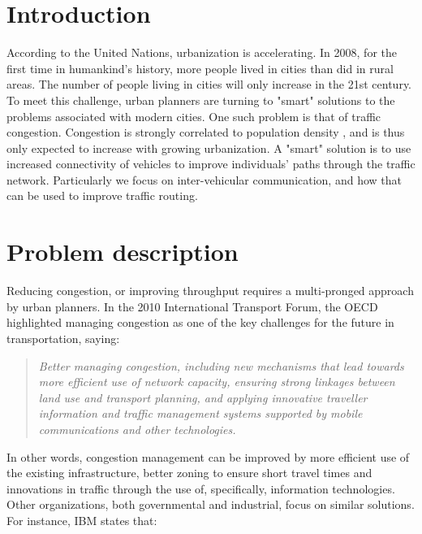 \documentclass{article}
\begin{document}
\section{Introduction}
According to the United Nations, urbanization is accelerating. In 2008, for the first time in humankind's history, more people lived in cities than did in rural areas. The number of people living in cities will only increase in the 21st century. To meet this challenge, urban planners are turning to "smart" solutions to the problems associated with modern cities. One such problem is that of traffic congestion. Congestion is strongly correlated to population density \cite{Manville2005}, and is thus only expected to increase with growing urbanization. A "smart" solution is to use increased connectivity of vehicles to improve individuals' paths through the traffic network. Particularly we focus on inter-vehicular communication, and how that can be used to improve traffic routing.

\section{Problem description}
Reducing congestion, or improving throughput requires a multi-pronged approach by urban planners. In the 2010 International Transport Forum, the OECD highlighted managing congestion as one of the key challenges for the future in transportation, saying: 
\begin{quote}
\emph{Better managing congestion, including new mechanisms that lead towards more efficient use of network capacity, ensuring strong linkages between land use and transport planning, and applying innovative traveller information and traffic management systems supported by mobile communications and other technologies.} \cite{OECD2010}
\end{quote}

In other words, congestion management can be improved by more efficient use of the existing infrastructure, better zoning to ensure short travel times and innovations in traffic through the use of, specifically, information technologies. Other organizations, both governmental and industrial, focus on similar solutions. For instance, IBM states that:
\end{document}
